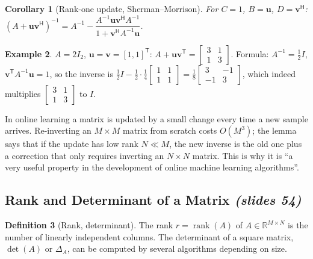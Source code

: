 \documentclass[11pt,a4paper]{article}
\newcommand{\R}{\mathbb{R}}
\newcommand{\T}{^{\mathsf{T}}}
\newcommand{\Her}{^{\mathsf{H}}}
\newcommand{\rank}{\operatorname{rank}}
\newcommand{\slides}[1]{\texorpdfstring{\emph{(slides #1)}}{(slides #1)}}
\theoremstyle{definition}
\newtheorem{definition}{Definition}[section]
\newtheorem{example}[definition]{Example}
\theoremstyle{plain}
\newtheorem{corollary}[definition]{Corollary}
\begin{document}
\begin{corollary}[Rank-one update, Sherman--Morrison]
For $C=1$, $B=\mathbf u$, $D=\mathbf v\Her$: $(A+\mathbf u\mathbf v\Her)^{-1}=A^{-1}-\dfrac{A^{-1}\mathbf u\mathbf v\Her A^{-1}}{1+\mathbf v\Her A^{-1}\mathbf u}$.
\end{corollary}

\begin{example}
$A=2I_2$, $\mathbf u=\mathbf v=[1,1]\T$: $A+\mathbf u\mathbf v\T=\begin{bmatrix}3&1\\1&3\end{bmatrix}$. Formula: $A^{-1}=\tfrac12I$, $\mathbf v\T A^{-1}\mathbf u=1$, so the inverse is $\tfrac12I-\tfrac{1}{2}\cdot\tfrac14\begin{bmatrix}1&1\\1&1\end{bmatrix}=\tfrac18\begin{bmatrix}3&-1\\-1&3\end{bmatrix}$, which indeed multiplies $\begin{bmatrix}3&1\\1&3\end{bmatrix}$ to $I$.
\end{example}

\begin{intuition}
In online learning a matrix is updated by a small change every time a new sample arrives. Re-inverting an $M\times M$ matrix from scratch costs $O(M^3)$; the lemma says that if the update has low rank $N\ll M$, the new inverse is the old one plus a correction that only requires inverting an $N\times N$ matrix. This is why it is ``a very useful property in the development of online machine learning algorithms''.
\end{intuition}

\subsection{Rank and Determinant of a Matrix \slides{54}}

\begin{definition}[Rank, determinant]
The rank $r=\rank(A)$ of $A\in\R^{M\times N}$ is the number of linearly independent columns. The determinant of a square matrix, $\det(A)$ or $\Delta_A$, can be computed by several algorithms depending on size.
\end{definition}
\end{document}
